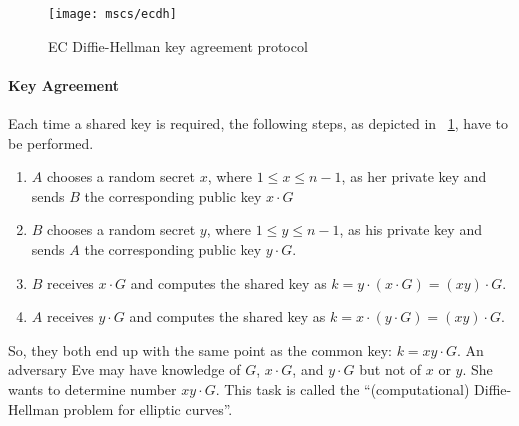 \begin{figure}
  \centering
  \texttt{[image: mscs/ecdh]}
  \caption{EC Diffie-Hellman key agreement protocol}\label{fig:ecdh}
\end{figure}

\paragraph{Key Agreement}

Each time a shared key is required, the following steps, as depicted in \figurename~\ref{fig:ecdh}, have to be performed.

\begin{enumerate}
  \item $A$ chooses a random secret $x$, where $1 \leq x \leq n-1$, as her private
    key and sends $B$ the corresponding public key $x \cdot G$
  \item $B$ chooses a random secret $y$, where $1 \leq y \leq n-1$, as his private
    key and sends $A$ the corresponding public key $y \cdot G$.
  \item $B$ receives $x \cdot G$ and computes the shared key as
    $k = y \cdot (x \cdot G) = (xy) \cdot G$.
  \item $A$ receives $y \cdot G$ and computes the shared key as
    $k = x \cdot (y \cdot G) = (xy) \cdot G$.
\end{enumerate}

So, they both end up with the same point as the common key: $k = xy \cdot G$.
An adversary Eve may have knowledge of $G$, $x\cdot G$,
and $y\cdot G$ but not of $x$ or $y$. She wants to determine number $xy\cdot G$. This
task is called the ``(computational) Diffie-Hellman problem for elliptic curves''.

